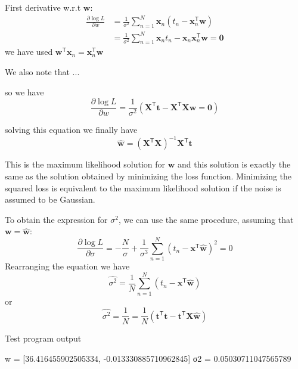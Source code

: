 \documentclass[a4paper,11pt]{article} %
\begin{document}
First derivative w.r.t $\mathbf{w}$:
\begin{align*}
\frac{\partial\log L}{\partial w} & = \frac{1}{\sigma^2}
\sum_{n=1}^{N} \mathbf{x}_{n} \left( t_{n} - \mathbf{x}^{\mathsf{T}}_{n} \mathbf{w} \right) \\
& = \frac{1}{\sigma^2}\sum_{n=1}^{N} \mathbf{x}_{n} t_{n} - 
\mathbf{x}_{n}\mathbf{x}_{n}^{\mathsf{T}}\mathbf{w}
= \mathbf{0}
\end{align*}
we have used
$\mathbf{w}^{\mathsf{T}}\mathbf{x}_{n} = \mathbf{x}_{n}^{\mathsf{T}}\mathbf{w}$

We also note that ...

so we have
\begin{equation}
\frac{\partial\log L}{\partial w} = \frac{1}{\sigma^2}\left(
\mathbf{X}^{\mathsf{T}}\mathbf{t} - \mathbf{X}^{\mathsf{T}}\mathbf{X}\mathbf{w} = \mathbf{0}
\right)
\end{equation}

solving this equation we finally have
\begin{equation}
\widehat{\mathbf{w}} = \left(\mathbf{X}^{\mathsf{T}}\mathbf{X}\right)^{-1}
\mathbf{X}^{\mathsf{T}}\mathbf{t}
\end{equation}

This is the maximum likelihood solution for $\mathbf{w}$ and this solution is exactly
the same as the solution obtained by minimizing the loss function.
Minimizing the squared loss is equivalent
to the maximum likelihood solution if the noise is assumed to be Gaussian.

To obtain the expression for $\sigma^2$, we can use the same procedure,
assuming that $\mathbf{w} = \widehat{\mathbf{w}}$:
\begin{equation}
\frac{\partial \log L}{\partial \sigma} = -\frac{N}{\sigma} +
\frac{1}{\sigma^3}\sum_{n=1}^{N} (t_{n} - \mathbf{x}^{\mathsf{T}}\widehat{\mathbf{w}})^2 = 0
\end{equation}
Rearranging the equation we have
\begin{equation}
\widehat{\sigma^2} = \frac{1}{N}\sum_{n=1}^{N} (t_n - \mathbf{x}^{\mathsf{T}}\widehat{\mathbf{w}})
\end{equation}
or
\begin{equation}
\widehat{\sigma^2} = \frac{1}{N} = \frac{1}{N}\left(
\mathbf{t}^{\mathsf{T}}\mathbf{t} - \mathbf{t}^{\mathsf{T}}\mathbf{X}\widehat{\mathbf{w}}
\right)
\end{equation}

Test program output
\begin{textcode}
w = [36.416455902505334, -0.013330885710962845]
σ2 = 0.05030711047565789
\end{textcode}
\end{document}
